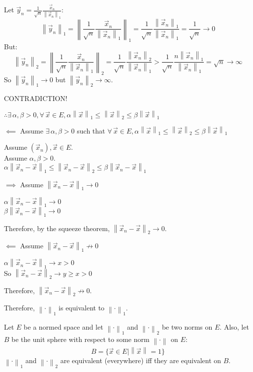 \documentclass[letterpaper,12pt,fleqn]{article}
\newcommand{\nnorm}[2]{\left\|#1\right\|_{#2}}
\newcommand{\norm}[1]{\nnorm{#1}{}}
\newcommand{\vx}{\vec{x}}
\newcommand{\vy}{\vec{y}}
\renewcommand{\a}{\alpha}
\renewcommand{\b}{\beta}
\begin{document}
\begin{theproof}
\begin{description}
\begin{description}
      Let $\vy_n=\frac{1}{\sqrt{n}}\frac{\vx_n}{\nnorm{\vx_n}{1}}$:
      \[\nnorm{\vy_n}{1}=
      \nnorm{\frac{1}{\sqrt{n}}\frac{\vx_n}{\nnorm{\vx_n}{1}}}{1}=
      \frac{1}{\sqrt{n}}\frac{\nnorm{\vx_n}{1}}{\nnorm{\vx_n}{1}}=
      \frac{1}{\sqrt{n}}\to0\]
      But:
      \[\nnorm{\vy_n}{2}=
      \nnorm{\frac{1}{\sqrt{n}}\frac{\vx_n}{\nnorm{\vx_n}{1}}}{2}=
      \frac{1}{\sqrt{n}}\frac{\nnorm{\vx_n}{2}}{\nnorm{\vx_n}{1}}>
      \frac{1}{\sqrt{n}}\frac{n\nnorm{\vx_n}{1}}{\nnorm{\vx_n}{1}}=
      \sqrt{n}\to\infty\]
      So $\nnorm{\vy_n}{1}\to0$ but $\nnorm{\vy_n}{2}\to\infty$.
    
      CONTRADICTION!
    \end{description}

    $\therefore\exists\,\a,\b>0,\forall\,\vx\in E,
    \a\nnorm{\vx}{1}\le\nnorm{\vx}{2}\le\b\nnorm{\vx}{1}$

    \item $\impliedby$ Assume $\exists\,\a,\b>0$ such that $\forall\,\vx\in E,
      \a\nnorm{\vx}{1}\le\nnorm{\vx}{2}\le\b\nnorm{\vx}{1}$

      Assume $(\vx_n),\vx\in E$. \\
      Assume $\a,\b>0$. \\
      $\a\nnorm{\vx_n-\vx}{1}\le\nnorm{\vx_n-\vx}{2}\le\b\nnorm{\vx_n-\vx}{1}$
      
      \begin{description}
      \item $\implies$ Assume $\nnorm{\vx_n-\vx}{1}\to0$

        $\a\nnorm{\vx_n-\vx}{1}\to0$ \\
        $\b\nnorm{\vx_n-\vx}{1}\to0$

        Therefore, by the squeeze theorem, $\nnorm{\vx_n-\vx}{2}\to0$.
        
      \item $\impliedby$ Assume $\nnorm{\vx_n-\vx}{1}\not\to0$

        $\a\nnorm{\vx_n-\vx}{1}\to x>0$ \\
        So $\nnorm{\vx_n-\vx}{2}\to y\ge x>0$

        Therefore, $\nnorm{\vx_n-\vx}{2}\not\to0$.
      \end{description}

      Therefore, $\nnorm{\cdot}{1}$ is equivalent to $\nnorm{\cdot}{1}$.
  \end{description}
\end{theproof}

\begin{theorem}
  Let $E$ be a normed space and let $\nnorm{\cdot}{1}$ and $\nnorm{\cdot}{2}$
  be two norms on $E$. Also, let $B$ be the unit sphere with respect to some
  norm $\norm{\cdot}$ on $E$:
  \[B=\{\vx\in E|\norm{\vx}=1\}\]
  $\nnorm{\cdot}{1}$ and $\nnorm{\cdot}{2}$ are equivalent (everywhere)
  iff they are equivalent on $B$.
\end{theorem}
\end{document}
